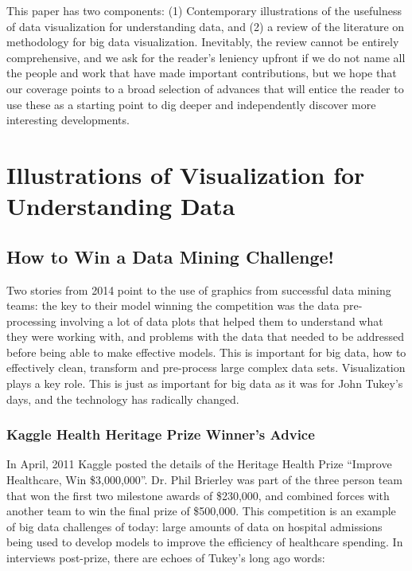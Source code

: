 \documentclass[11pt]{article}
\begin{document}
This paper has two components: (1) Contemporary illustrations of the usefulness of data visualization for understanding data, and (2) a review of the literature on methodology for big data visualization. Inevitably, the review cannot be entirely comprehensive, and we ask for the reader's leniency upfront if we do not name all the people and work that have made important contributions, but we hope that our coverage points to a broad selection of advances that will entice the reader to use these as a starting point to dig deeper and independently discover more interesting developments.

\section{Illustrations of Visualization for Understanding Data}

\subsection{How to Win a Data Mining Challenge!}

Two stories from 2014 point to the use of graphics from successful data mining teams: the key to their model winning the competition was the data pre-processing involving a lot of data plots that helped them to understand what they were working with, and problems with the data that needed to be addressed before being able to make effective models. This is important for big data, how to effectively clean, transform and pre-process large complex data sets. Visualization plays a key role. This is just as important for big data as it was for John Tukey's days, and the technology has radically changed.

\subsubsection{Kaggle Health Heritage Prize Winner's Advice}

In April, 2011 Kaggle posted the details of the Heritage Health Prize ``Improve Healthcare, Win \$3,000,000''.  Dr. Phil Brierley was part of the three person team that won the first two milestone awards of \$230,000, and combined forces with another team to win the final prize of \$500,000. This competition is an example of big data challenges of today: large amounts of data on hospital admissions being used to develop models to improve the efficiency of healthcare spending. In interviews post-prize, there are echoes of Tukey's long ago words:
\end{document}
